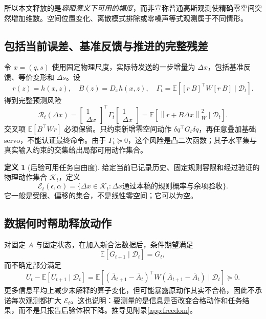 \documentclass[UTF8,11pt,a4paper,fontset=fandol]{ctexart}
\numberwithin{equation}{section}
\theoremstyle{definition}
\newtheorem{definition}[theorem]{定义}
\newcommand{\E}{\mathbb E}
\newcommand{\D}{\mathcal D}
\newcommand{\norm}[1]{\left\lVert#1\right\rVert}
\begin{document}
所以本文释放的是\emph{容限意义下可用的幅度}，而非宣称普通高斯观测使精确零空间突然增加维数。空间位置变化、离散模式排除或零噪声等式观测属于不同情形。

\subsection{包括当前误差、基准反馈与推进的完整残差}
令 $x=(q,s)$ 使用固定物理尺度，实际待发送的一步增量为 $\Delta x$，包括基准反馈、等价变形和 $\Delta s$。设
\begin{equation}
 r(z)=h(x,z),\quad B(z)=D_xh(x,z),\quad
 \Gamma_t=\E\!\left[
 [r\ B]^\top W[r\ B]\mid\D_t\right].
 \label{eq:Gamma}
\end{equation}
得到完整预测风险
\begin{equation}
 \mathcal R_t(\Delta x)=
 \begin{bmatrix}1\\\Delta x\end{bmatrix}^{\!\top}
 \Gamma_t
 \begin{bmatrix}1\\\Delta x\end{bmatrix}
 =\E[\norm{r+B\Delta x}_W^2\mid\D_t].
 \label{eq:fullrisk}
\end{equation}
交叉项 $\E[B^\top Wr]$ 必须保留。只约束新增零空间动作 $\delta q^\top G_t\delta q$，再任意叠加基础 servo，不能认证最终命令。由于 $\Gamma_t\succeq0$，这个风险是凸二次函数；其子水平集与真实输入约束的交集给出局部可用动作集合。

\begin{definition}[后验可用任务自由度]
给定当前已记录历史、固定规则容限和经过验证的物理动作集合 $\mathcal K_t$，定义
\begin{equation}
 \mathcal E_t(\epsilon,\alpha)=
 \{\Delta x\in\mathcal K_t:\Delta x\text{通过本稿的规则概率与余项验收}\}.
 \label{eq:usable}
\end{equation}
它一般是受限、偏移的集合，不是线性零空间；它可以为空。
\end{definition}

\subsection{数据何时帮助释放动作}
对固定 $A$ 与固定状态，在加入新合法数据后，条件期望满足
\begin{equation}
 \E[G_{t+1}\mid\D_t]=G_t,
 \label{eq:martingale}
\end{equation}
而不确定部分满足
\begin{equation}
 U_t-\E[U_{t+1}\mid\D_t]
 =\E[(\bar A_{t+1}-\bar A_t)^\top W
              (\bar A_{t+1}-\bar A_t)\mid\D_t]\succeq0.
 \label{eq:uncertaintyreduce}
\end{equation}
更多信息平均上减少未解释的算子变化，但可能暴露原动作其实不合格，因此不承诺每次观测都扩大 $\mathcal E_t$。这也说明：要测量的是信息是否改变合格动作和任务结果，而不是只报告后验体积下降。推导见附录\ref{app:freedom}。
\end{document}
